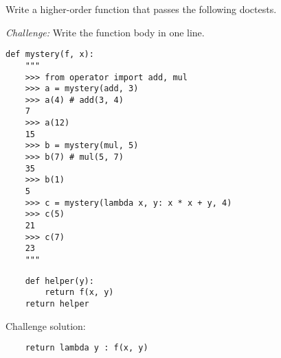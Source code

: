 \begin{blocksection}
\question Write a higher-order function that passes the following doctests.

\emph{Challenge:} Write the function body in one line.

\begin{lstlisting}
def mystery(f, x):
    """
    >>> from operator import add, mul
    >>> a = mystery(add, 3)
    >>> a(4) # add(3, 4)
    7
    >>> a(12)
    15
    >>> b = mystery(mul, 5)
    >>> b(7) # mul(5, 7)
    35
    >>> b(1)
    5
    >>> c = mystery(lambda x, y: x * x + y, 4)
    >>> c(5)
    21
    >>> c(7)
    23
    """
\end{lstlisting}

\begin{solution}[1in]
\begin{lstlisting}
    def helper(y):
        return f(x, y)
    return helper
\end{lstlisting}

Challenge solution:

\begin{lstlisting}
    return lambda y : f(x, y)
\end{lstlisting}
\end{solution}
\end{blocksection}